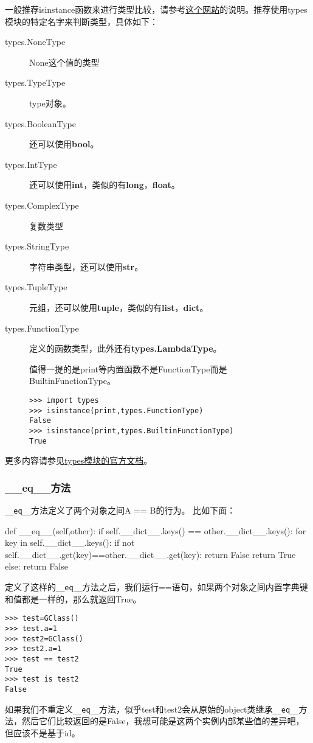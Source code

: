 \documentclass[12pt,oneside]{book}
\begin{document}
\begin{common-format}
一般推荐isinstance函数来进行类型比较，请参考\href{http://stackoverflow.com/questions/1549801/differences-between-isinstance-and-type-in-python}{这个网站}的说明。推荐使用types模块的特定名字来判断类型，具体如下：
\begin{description}
\item[types.NoneType] None这个值的类型
\item[types.TypeType] type对象。
\item[types.BooleanType] 还可以使用\textbf{bool}。
\item[types.IntType] 还可以使用\textbf{int}，类似的有\textbf{long}，\textbf{float}。
\item[types.ComplexType] 复数类型
\item[types.StringType] 字符串类型，还可以使用\textbf{str}。
\item[types.TupleType] 元组，还可以使用\textbf{tuple}，类似的有\textbf{list}，\textbf{dict}。
\item[types.FunctionType] 定义的函数类型，此外还有\textbf{types.LambdaType}。

值得一提的是print等内置函数不是FunctionType而是BuiltinFunctionType。
\begin{Verbatim}
>>> import types
>>> isinstance(print,types.FunctionType)
False
>>> isinstance(print,types.BuiltinFunctionType)
True
\end{Verbatim}

\end{description}

\begin{large}
更多内容请参见\href{https://docs.python.org/3.4/library/types.html}{types模块的官方文档}。
\end{large}

\subsubsection{\_{}\_{}eq\_{}\_{}方法}
\verb+__eq__+方法定义了两个对象之间A == B的行为。
比如下面：
\begin{tcbpython}[]
def __eq__(self,other):
    if self.__dict__.keys() == other.__dict__.keys():
        for key in self.__dict__.keys():
            if  not self.__dict__.get(key)==other.__dict__.get(key):
                return False
        return True
    else:
        return False
\end{tcbpython}
定义了这样的\verb+__eq__+方法之后，我们运行==语句，如果两个对象之间内置字典键和值都是一样的，那么就返回True。
\begin{Verbatim}
>>> test=GClass()
>>> test.a=1
>>> test2=GClass()
>>> test2.a=1
>>> test == test2
True
>>> test is test2
False
\end{Verbatim}
如果我们不重定义\verb+__eq__+方法，似乎test和test2会从原始的object类继承\verb+__eq__+方法，然后它们比较返回的是False，我想可能是这两个实例内部某些值的差异吧，但应该不是基于id。



\end{common-format}
\end{document}
